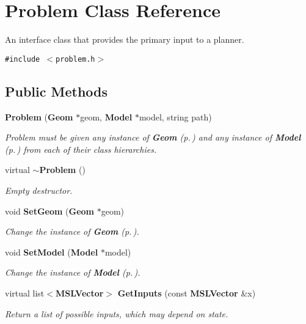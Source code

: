 \section{Problem  Class Reference}
\label{class_Problem}
An interface class that provides the primary input to a planner. 


{\tt \#include $<$problem.h$>$}

\subsection*{Public Methods}
\begin{CompactItemize}
\item 
{\bf Problem} ({\bf Geom} $\ast$geom, {\bf Model} $\ast$model, string path)
\begin{CompactList}\small\item\em Problem must be given any instance of {\bf Geom} {\rm (p.\,\pageref{class_Geom})} and any instance of {\bf Model} {\rm (p.\,\pageref{class_Model})} from each of their class hierarchies.\item\end{CompactList}\item 
virtual {\bf $\sim$Problem} ()
\begin{CompactList}\small\item\em Empty destructor.\item\end{CompactList}\item 
void {\bf Set\-Geom} ({\bf Geom} $\ast$geom)
\begin{CompactList}\small\item\em Change the instance of {\bf Geom} {\rm (p.\,\pageref{class_Geom})}.\item\end{CompactList}\item 
void {\bf Set\-Model} ({\bf Model} $\ast$model)
\begin{CompactList}\small\item\em Change the instance of {\bf Model} {\rm (p.\,\pageref{class_Model})}.\item\end{CompactList}\item 
virtual list$<${\bf MSLVector}$>$ {\bf Get\-Inputs} (const {\bf MSLVector} \&x)
\begin{CompactList}\small\item\em Return a list of possible inputs, which may depend on state.\item\end{CompactList}\item 

\end{CompactItemize}
